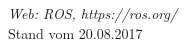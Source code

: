 \begin{thebibliography}{VP}
 \emph{Web: ROS, https://ros.org/}
\\Stand vom 20.08.2017


\end{thebibliography}